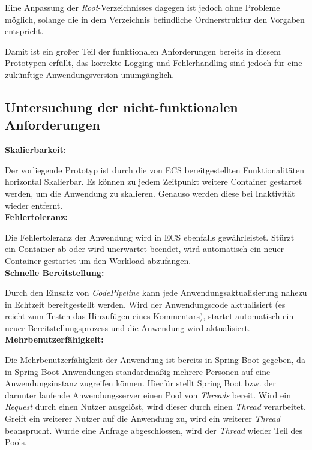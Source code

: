 Eine Anpassung der \textit{Root}-Verzeichnisses dagegen ist jedoch ohne Probleme möglich, solange die in dem Verzeichnis befindliche Ordnerstruktur den Vorgaben entspricht.

Damit ist ein großer Teil der funktionalen Anforderungen bereits in diesem Prototypen erfüllt, das korrekte Logging und Fehlerhandling sind jedoch für eine zukünftige Anwendungsversion unumgänglich.

\subsection{Untersuchung der nicht-funktionalen Anforderungen}
\textbf{Skalierbarkeit:}

Der vorliegende Prototyp ist durch die von \ac{ECS} bereitgestellten Funktionalitäten horizontal Skalierbar. Es können zu jedem Zeitpunkt weitere Container gestartet werden, um die Anwendung zu skalieren. Genauso werden diese bei Inaktivität wieder entfernt. \\

\textbf{Fehlertoleranz:}

Die Fehlertoleranz der Anwendung wird in \ac{ECS} ebenfalls gewährleistet. Stürzt ein Container ab oder wird unerwartet beendet, wird automatisch ein neuer Container gestartet um den Workload abzufangen. \\

\textbf{Schnelle Bereitstellung:}

Durch den Einsatz von \textit{CodePipeline} kann jede Anwendungsaktualisierung nahezu in Echtzeit bereitgestellt werden. Wird der Anwendungscode aktualisiert (es reicht zum Testen das Hinzufügen eines Kommentars), startet automatisch ein neuer Bereitstellungsprozess und die Anwendung wird aktualisiert. \\

\textbf{Mehrbenutzerfähigkeit:}

Die Mehrbenutzerfähigkeit der Anwendung ist bereits in \gls{Spring Boot} gegeben, da in \gls{Spring Boot}-Anwendungen standardmäßig mehrere Personen auf eine Anwendungsinstanz zugreifen können. Hierfür stellt \gls{Spring Boot} bzw. der darunter laufende Anwendungsserver einen Pool von \textit{Threads} bereit. Wird ein \textit{Request} durch einen Nutzer ausgelöst, wird dieser durch einen \textit{Thread} verarbeitet. Greift ein weiterer Nutzer auf die Anwendung zu, wird ein weiterer \textit{Thread} beansprucht. Wurde eine Anfrage abgeschlossen, wird der \textit{Thread} wieder Teil des Pools. \pagebreak

